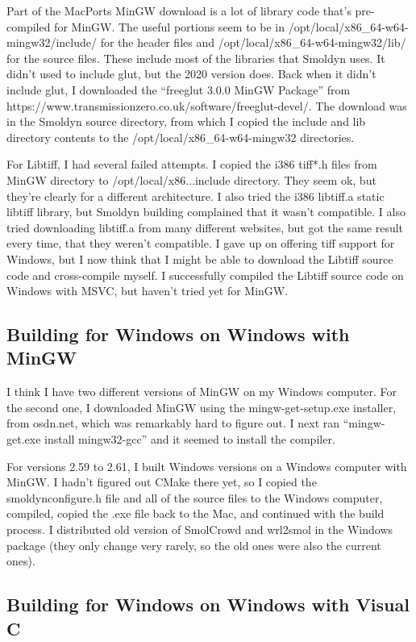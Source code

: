 \documentclass {book}
\begin{document}
Part of the MacPorts MinGW download is a lot of library code that's pre-compiled for MinGW. The useful portions seem to be in /opt/local/x86\_64-w64-mingw32/include/ for the header files and /opt/local/x86\_64-w64-mingw32/lib/ for the source files. These include most of the libraries that Smoldyn uses. It didn't used to include glut, but the 2020 version does. Back when it didn't include glut, I downloaded the ``freeglut 3.0.0 MinGW Package'' from https://www.transmissionzero.co.uk/software/freeglut-devel/. The download was in the Smoldyn source directory, from which I copied the include and lib directory contents to the /opt/local/x86\_64-w64-mingw32 directories.

For Libtiff, I had several failed attempts. I copied the i386 tiff*.h files from MinGW directory to /opt/local/x86...include directory. They seem ok, but they're clearly for a different architecture. I also tried the i386 libtiff.a static libtiff library, but Smoldyn building complained that it wasn't compatible. I also tried downloading libtiff.a from many different websites, but got the same result every time, that they weren't compatible. I gave up on offering tiff support for Windows, but I now think that I might be able to download the Libtiff source code and cross-compile myself. I successfully compiled the Libtiff source code on Windows with MSVC, but haven't tried yet for MinGW.


\subsection{Building for Windows on Windows with MinGW}

I think I have two different versions of MinGW on my Windows computer. For the second one, I downloaded MinGW using the mingw-get-setup.exe installer, from osdn.net, which was remarkably hard to figure out. I next ran ``mingw-get.exe install mingw32-gcc'' and it seemed to install the compiler.

For versions 2.59 to 2.61, I built Windows versions on a Windows computer with MinGW. I hadn't figured out CMake there yet, so I copied the smoldynconfigure.h file and all of the source files to the Windows computer, compiled, copied the .exe file back to the Mac, and continued with the build process. I distributed old version of SmolCrowd and wrl2smol in the Windows package (they only change very rarely, so the old ones were also the current ones).

\subsection{Building for Windows on Windows with Visual C}
\end{document}
